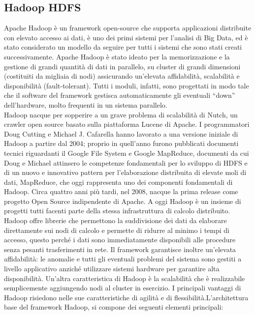\subsection{Hadoop HDFS}
\label{sec:hadoop HDFS}
Apache Hadoop è un framework open-source che supporta applicazioni distribuite con elevato accesso ai dati, è uno dei primi sistemi per l’analisi di Big Data, ed è stato considerato un modello da seguire per tutti i sistemi che sono stati creati successivamente. Apache Hadoop è stato ideato per la memorizzazione e la gestione di grandi quantità di dati in parallelo, su cluster di grandi dimensioni (costituiti da migliaia di nodi) assicurando un'elevata affidabilità, scalabilità e disponibilità (fault-tolerant). Tutti i moduli, infatti, sono progettati in modo tale che il software del framework gestisca automaticamente gli eventuali “down” dell’hardware, molto frequenti in un sistema parallelo.
\\Hadoop nacque per sopperire a un grave problema di scalabilità di Nutch, un crawler open source basato sulla piattaforma Lucene di Apache. I programmatori Doug Cutting e Michael J. Cafarella hanno lavorato a una versione iniziale di Hadoop a partire dal 2004; proprio in quell’anno furono pubblicati documenti tecnici riguardanti il Google File System e Google MapReduce, documenti da cui Doug e Michael attinsero le competenze fondamentali per lo sviluppo di HDFS e di un nuovo e innovativo pattern per l’elaborazione distribuita di elevate moli di dati, MapReduce, che oggi rappresenta uno dei componenti fondamentali di Hadoop. Circa quattro anni più tardi, nel 2008, nacque la prima release come progetto Open Source indipendente di Apache. A oggi Hadoop è un insieme di progetti tutti facenti parte della stessa infrastruttura di calcolo distribuito.
\\Hadoop offre librerie che permettono la suddivisione dei dati da elaborare direttamente sui nodi di calcolo e permette di ridurre al minimo i tempi di accesso, questo perché i dati sono immediatamente disponibili alle procedure senza pesanti trasferimenti in rete. Il framework garantisce inoltre un’elevata affidabilità: le anomalie e tutti gli eventuali problemi del sistema sono gestiti a livello applicativo anziché utilizzare sistemi hardware per garantire alta disponibilità. Un’altra caratteristica di Hadoop è la scalabilità che è realizzabile semplicemente aggiungendo nodi al cluster in esercizio. I principali vantaggi di Hadoop risiedono nelle sue caratteristiche di agilità e di flessibilità.L’architettura base del framework Hadoop, si compone dei seguenti elementi principali:
